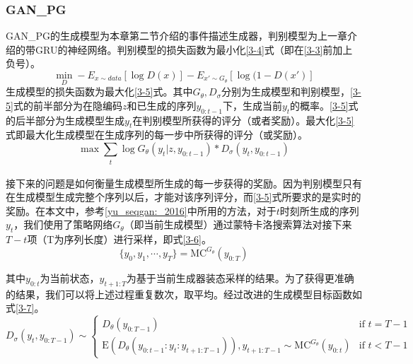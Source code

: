 \documentclass[]{template}
\begin{document}
\subsubsection{GAN\_PG}
GAN\_PG的生成模型为本章第二节介绍的事件描述生成器，判别模型为上一章介绍的带GRU的神经网络。判别模型的损失函数为最小化\ref{3-4}式（即在\ref{3-3}前加上负号）。
\begin{equation}\label{3-4}
    \mathop{min}_D-E_{x\sim data}[\log D(x)]-E_{x'\sim G_\theta}[\log(1-D(x')]
\end{equation}
生成模型的损失函数为最大化\ref{3-5}式。其中$G_\theta,D_\sigma$分别为生成模型和判别模型，\ref{3-5}式的前半部分为在隐编码$z$和已生成的序列$y_{0:t-1}$下，生成当前$y_t$的概率。\ref{3-5}式的后半部分为生成模型生成$y_t$在判别模型所获得的评分（或者奖励）。最大化\ref{3-5}式即最大化生成模型在生成序列的每一步中所获得的评分（或奖励）。
\begin{equation}\label{3-5}
\mathop{max}\sum_{\substack{t}}\log G_\theta (y_t|z,y_{0:t-1})*D_\sigma (y_t,y_{0:t-1})
\end{equation}

接下来的问题是如何衡量生成模型所生成的每一步获得的奖励。因为判别模型只有在生成模型生成完整个序列以后，才能对该序列评分，而\ref{3-5}式所要求的是实时的奖励。在本文中，参考\ref{yu_seqgan:_2016}中所用的方法，对于$t$时刻所生成的序列$y_t$，我们使用了策略网络$G_\theta$（即当前生成模型）通过蒙特卡洛搜索算法对接下来$T-t$项（T为序列长度）进行采样，即式\ref{3-6}。
\begin{equation}\label{3-6}
    \{y_0,y_1,\dotsb,y_T\}=\mathrm{MC}^{G_\theta}(y_{0:T})
\end{equation}

其中$y_{0:t}$为当前状态，$y_{t+1:T}$为基于当前生成器装态采样的结果。为了获得更准确的结果，我们可以将上述过程重复数次，取平均。经过改进的生成模型目标函数如式\ref{3-7}。
\begin{equation}\label{3-7}
D_\sigma(y_t,y_{0:T-1})\sim 
\begin{cases}
    D_\theta(y_{0:T-1}) & \text{if } t =T-1 \\
    \mathrm{E}(D_\theta(y_{0:t-1}:y_t:y_{t+1:T-1})),y_{t+1:T-1}\sim \mathrm{MC}^{G_\theta}(y_{0:t}) & \text{if }t<T-1
\end{cases}
\end{equation}
\end{document}
